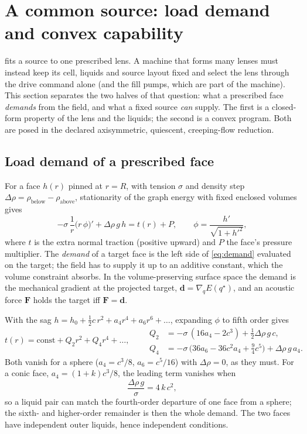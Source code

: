 \section{A common source: load demand and convex capability}\label{sec:universal}

 fits a source to one prescribed lens. A machine that forms
many lenses must instead keep its cell, liquids and source layout fixed and
select the lens through the drive command alone (and the fill pumps, which are
part of the machine). This section separates the two halves of that question:
what a prescribed face \emph{demands} from the field, and what a fixed source
\emph{can} supply. The first is a closed-form property of the lens and the
liquids; the second is a convex program. Both are posed in the declared
axisymmetric, quiescent, creeping-flow reduction.

\subsection{Load demand of a prescribed face}
For a face $h(r)$ pinned at $r=R$, with tension $\sigma$ and density step
$\Delta\rho=\rho_{\text{below}}-\rho_{\text{above}}$, stationarity of the graph
energy with fixed enclosed volumes gives
\begin{equation}
 -\sigma\,\frac1r\bigl(r\,\phi\bigr)'+\Delta\rho\,g\,h=t(r)+P,\qquad
 \phi=\frac{h'}{\sqrt{1+h'^2}},
 \label{eq:demand}
\end{equation}
where $t$ is the extra normal traction (positive upward) and $P$ the face's
pressure multiplier. The \emph{demand} of a target face is the left side of
\cref{eq:demand} evaluated on the target; the field has to supply it up to an
additive constant, which the volume constraint absorbs. In the volume-preserving
surface space the demand is the mechanical gradient at the projected target,
$\bm d=\nabla_q E(q^\star)$, and an acoustic force $\bm F$ holds the target iff
$\bm F=\bm d$.

With the sag $h=h_0+\tfrac12 c\,r^2+a_4r^4+a_6r^6+\dots$, expanding $\phi$ to
fifth order gives
\begin{equation}
 t(r)=\text{const}+Q_2r^2+Q_4r^4+\dots,\qquad
 \begin{aligned}
 Q_2&=-\sigma\,(16a_4-2c^3)+\tfrac12\Delta\rho\,g\,c,\\
 Q_4&=-\sigma\,\bigl(36a_6-36c^2a_4+\tfrac94c^5\bigr)+\Delta\rho\,g\,a_4 .
 \end{aligned}
 \label{eq:demand-series}
\end{equation}
Both vanish for a sphere ($a_4=c^3/8$, $a_6=c^5/16$) with $\Delta\rho=0$, as
they must. For a conic face, $a_4=(1+k)c^3/8$, the leading term vanishes when
\begin{equation}
 \frac{\Delta\rho\,g}{\sigma}=4\,k\,c^2 ,
 \label{eq:matching-rule}
\end{equation}
so a liquid pair can match the fourth-order departure of one face from a
sphere; the sixth- and higher-order remainder is then the whole demand. The
two faces have independent outer liquids, hence independent conditions.

